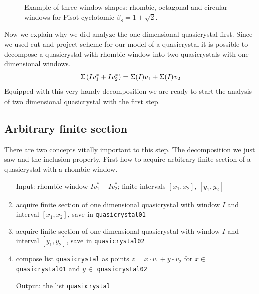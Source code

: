 \documentclass[text.tex]{subfiles}
\begin{document}
\begin{figure}[h!]
\centering
{}
\caption{Example of three window shapes: rhombic, octagonal and circular windows for Pisot-cyclotomic $\beta_8=1+\sqrt{2}$.}
\end{figure}

Now we explain why we did analyze the one dimensional quasicrystal first. Since we used cut-and-project scheme for our model of a quasicrystal it is possible to decompose a quasicrystal with rhombic window into two quasicrystals with one dimensional windows. 
$$\Sigma(Iv_1^\ast+Iv_2^\ast) = \Sigma(I)v_1+\Sigma(I)v_2$$
Equipped with this very handy decomposition we are ready to start the analysis of two dimensional quasicrystal with the first step. 

\subsection{Arbitrary finite section}
There are two concepts vitally important to this step. The decomposition we just saw and the inclusion property. First how to acquire arbitrary finite section of a quasicrystal with a rhombic window. 

\begin{enumerate}
\item[Input:] rhombic window $Iv_1^\ast+Iv_2^\ast$; finite intervals $[x_1,x_2]$, $[y_1,y_2]$
\item acquire finite section of one dimensional quasicrystal with window $I$ and interval $[x_1,x_2]$, save in \texttt{quasicrystal01}
\item acquire finite section of one dimensional quasicrystal with window $I$ and interval $[y_1,y_2]$, save in \texttt{quasicrystal02}
\item compose list \texttt{quasicrystal} as points $z=x\cdot v_1+y\cdot v_2$ for $x\in$ \texttt{quasicrystal01} and $y\in$ \texttt{quasicrystal02}
\item[Output:] the list \texttt{quasicrystal}
\end{enumerate}
\end{document}
